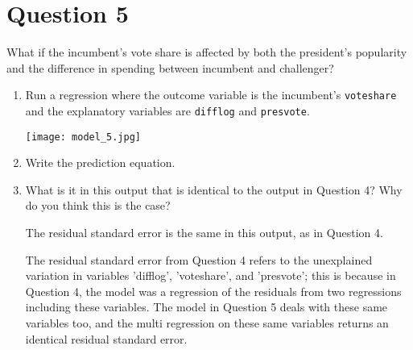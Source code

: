 \documentclass[12pt,letterpaper]{article}
\begin{document}
	\newpage	

\section*{Question 5}
\noindent What if the incumbent's vote share is affected by both the president's popularity and the difference in spending between incumbent and challenger? 
	\begin{enumerate}
		\item Run a regression where the outcome variable is the incumbent's \texttt{voteshare} and the explanatory variables are \texttt{difflog} and \texttt{presvote}.	
			 
		\texttt{[image: model\_5.jpg]}
		\vspace{5cm}
		\item Write the prediction equation.	
			 
		\vspace{.5cm}
		\item What is it in this output that is identical to the output in Question 4? Why do you think this is the case?
	
		\vspace{.5cm}
		The residual standard error is the same in this output, as in Question 4. 
		
		The residual standard error from Question 4 refers to the unexplained variation in variables 'difflog', 'voteshare',  and 'presvote'; this is because in Question 4, the model was a regression of the residuals from two regressions including these variables. The model in Question 5 deals with these same variables too, and the multi regression on these same variables returns an identical residual standard error. 
	\end{enumerate}
\end{document}
